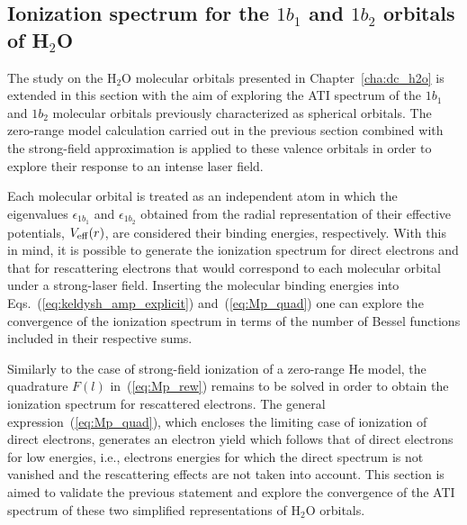 \subsection{\label{sec:mo_sfa} Ionization spectrum for the $1b_{1}$ and $1b_{2}$ orbitals
  of H$_{2}$O}



The study on the H$_{2}$O molecular orbitals presented in
Chapter~\ref{cha:dc_h2o} is extended in this section with the aim of
exploring the ATI spectrum of the $1b_{1}$ and $1b_{2}$ molecular
orbitals previously characterized as spherical orbitals. The
zero-range model calculation carried out in the previous section
combined with the strong-field approximation is applied to these
valence orbitals in order to explore their response to an intense
laser field.


Each molecular orbital is treated as an independent atom in which the
eigenvalues $\epsilon_{1b_{1}}$ and $\epsilon_{1b_{2}}$ obtained from
the radial representation of their effective potentials,
$V_{\rm{eff}}(r)$, are considered their binding energies,
respectively. With this in mind, it is possible to generate the
ionization spectrum for direct electrons and that for rescattering
electrons that would correspond to each molecular orbital under a
strong-laser field. Inserting the molecular binding energies into
Eqs.~(\ref{eq:keldysh_amp_explicit}) and~(\ref{eq:Mp_quad}) one can
explore the convergence of the ionization spectrum in terms of the
number of Bessel functions included in their respective sums.

Similarly to the case of strong-field ionization of a zero-range He
model, the quadrature $F(l)$ in~(\ref{eq:Mp_rew}) remains to be solved
in order to obtain the ionization spectrum for rescattered
electrons. The general expression~(\ref{eq:Mp_quad}), which encloses
the limiting case of ionization of direct electrons, generates an
electron yield which follows that of direct electrons for low
energies, i.e., electrons energies for which the direct spectrum is
not vanished and the rescattering effects are not taken into
account. This section is aimed to validate the previous statement and
explore the convergence of the ATI spectrum of these two simplified
representations of H$_{2}$O orbitals.

